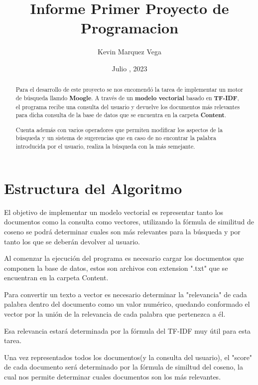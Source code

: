 \documentclass{article}
\begin{document}
\title{Informe Primer Proyecto de Programacion}
\author{Kevin Marquez Vega}
\date{Julio , 2023}

\maketitle

\begin{abstract}
    Para el desarrollo de este proyecto se nos encomendó la tarea de implementar un motor de búsqueda llamdo \textbf{Moogle}.
     A través de un \textbf{modelo vectorial} basado en \textbf{TF-IDF}, el programa recibe una consulta del usuario y devuelve los documentos
     más relevantes para dicha consulta de la base de datos que se encuentra en la carpeta \textbf{Content}.

     Cuenta además con varios operadores que permiten modificar los aspectos de la búsqueda y un sistema de sugerencias que
     en caso de no encontrar la palabra introducida por el usuario, realiza la búsqueda con la más semejante.
\end{abstract}

\newpage
\tableofcontents
\newpage
\section*{Estructura del Algoritmo}
El objetivo de implementar un modelo vectorial es representar tanto los documentos como la consulta como vectores, utilizando la fórmula de similitud
de coseno se podrá determinar cuales son más relevantes para la búsqueda y por tanto los que se deberán devolver al usuario.

Al comenzar la ejecución del programa es necesario cargar los documentos que componen la base de datos, estos son archivos
con extension ".txt" que se encuentran en la carpeta Content.

Para convertir un texto a vector es necesario determinar la "relevancia" de cada palabra dentro del documento como un valor numérico, quedando conformado
el vector por la unión de la relevancia de cada palabra que pertenezca a él.

Esa relevancia estará determinada por la fórmula del TF-IDF muy útil para esta tarea.

Una vez representados todos los documentos(y la consulta del usuario), el "score" de cada documento será determinado por la fórmula de similtud del coseno, la cual nos permite
determinar cuales documentos son los más relevantes.
\end{document}
